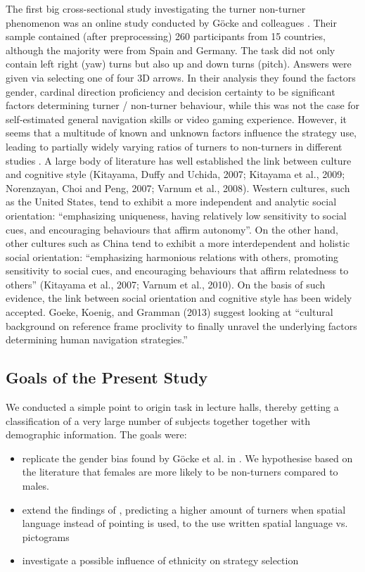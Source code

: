 \documentclass{frontiersSCNS} %
\begin{document}
The first big cross-sectional study investigating the turner non-turner phenomenon was an online study conducted by G\"ocke and colleagues \citep{Goeke2013}. Their sample contained (after preprocessing) 260 participants from 15 countries, although the majority were from Spain and Germany. The task did not only contain left right (yaw) turns but also up and down turns (pitch). Answers were given via selecting one of four 3D arrows. In their analysis they found the factors gender, cardinal direction proficiency and decision certainty to be significant factors determining turner / non-turner behaviour, while this was not the case for self-estimated general navigation skills or video gaming experience. However, it seems that a multitude of known and unknown factors influence the strategy use, leading to partially widely varying ratios of turners to non-turners in different studies .
A large body of literature has well established the link between culture and cognitive style (Kitayama, Duffy and Uchida, 2007; Kitayama et al., 2009; Norenzayan, Choi and Peng, 2007; Varnum et al., 2008). Western cultures, such as the United States, tend to exhibit a more independent and analytic social orientation: “emphasizing uniqueness, having relatively low sensitivity to social cues, and encouraging behaviours that affirm autonomy”. On the other hand, other cultures such as China tend to exhibit a more interdependent and holistic social orientation: “emphasizing harmonious relations with others, promoting sensitivity to social cues, and encouraging behaviours that affirm relatedness to others” (Kitayama et al., 2007; Varnum et al., 2010). On the basis of such evidence, the link between social orientation and cognitive style has been widely accepted. Goeke, Koenig, and Gramman (2013) suggest looking at “cultural background on reference frame proclivity to finally unravel the underlying factors determining human navigation strategies.”


\subsection{Goals of the Present Study}
We conducted a simple point to origin task in lecture halls, thereby getting a classification of a very large number of subjects together together with demographic information. The goals were:
\begin{itemize}
	\item replicate the gender bias found by G\"ocke et al. in \citep{Goeke2013}. We hypothesise based on the literature that females are more likely to be non-turners compared to males.
	\item extend the findings of \cite{Avraamides2004}, predicting a higher amount of turners when spatial language instead of pointing is used, to the use written spatial language vs. pictograms
	\item investigate a possible influence of ethnicity on strategy selection
\end{itemize}
\end{document}
